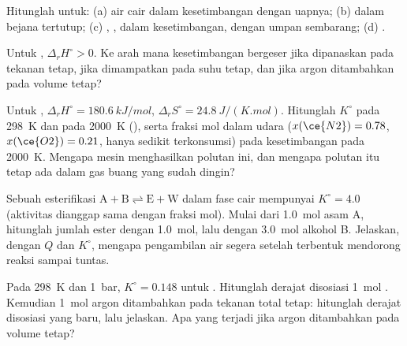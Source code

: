 \begin{exercise}[$\star$]\label{exo:b2:equilibrium-shifts:3}
Hitunglah  untuk: (a) air cair dalam kesetimbangan dengan uapnya;
(b)  dalam bejana tertutup; (c) ,
,  dalam kesetimbangan, dengan umpan sembarang;
(d) .
\end{exercise}

\begin{exercise}[$\star$]\label{exo:b2:equilibrium-shifts:4}
Untuk , $\Delta_r H^\circ > 0$. Ke arah mana
kesetimbangan bergeser jika dipanaskan pada tekanan tetap, jika dimampatkan
pada suhu tetap, dan jika argon ditambahkan pada volume tetap?
\end{exercise}

\begin{exercise}[$\star\star$]\label{exo:b2:equilibrium-shifts:5}
Untuk , $\Delta_r H^\circ = \qty{180.6}{kJ/mol}$,
$\Delta_r S^\circ = \qty{24.8}{J/(K.mol)}$. Hitunglah $K^\circ$ pada
\qty{298}{K} dan pada \qty{2000}{K} (), serta fraksi
mol  dalam udara ($x(\ce{N2}) = 0.78$, $x(\ce{O2}) = 0.21$, hanya
sedikit terkonsumsi) pada kesetimbangan pada \qty{2000}{K}. Mengapa mesin
menghasilkan polutan ini, dan mengapa polutan itu tetap ada dalam gas
buang yang sudah dingin?
\end{exercise}

\begin{exercise}[$\star\star$]\label{exo:b2:equilibrium-shifts:6}
Sebuah esterifikasi $\mathrm{A + B \rightleftharpoons E + W}$ dalam fase
cair mempunyai $K^\circ = 4.0$ (aktivitas dianggap sama dengan fraksi mol).
Mulai dari \qty{1.0}{mol} asam A, hitunglah jumlah ester dengan
\qty{1.0}{mol}, lalu dengan \qty{3.0}{mol} alkohol B. Jelaskan, dengan $Q$
dan $K^\circ$, mengapa pengambilan air segera setelah terbentuk mendorong
reaksi sampai tuntas.
\end{exercise}

\begin{exercise}[$\star\star$]\label{exo:b2:equilibrium-shifts:7}
Pada \qty{298}{K} dan \qty{1}{bar}, $K^\circ = 0.148$ untuk
. Hitunglah derajat disosiasi \qty{1}{mol} .
Kemudian \qty{1}{mol} argon ditambahkan pada tekanan total tetap: hitunglah
derajat disosiasi yang baru, lalu jelaskan. Apa yang terjadi jika argon
ditambahkan pada volume tetap?
\end{exercise}

